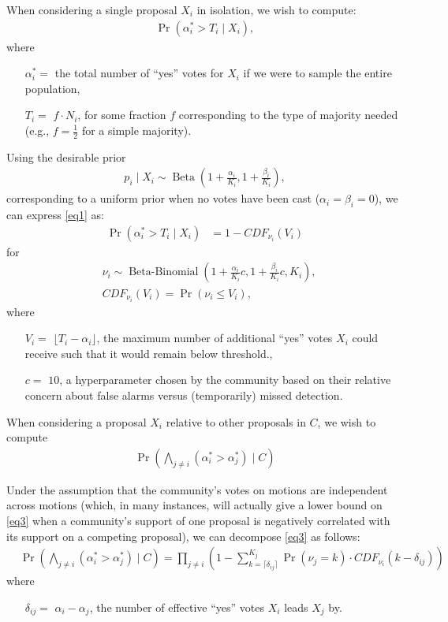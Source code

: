 \documentclass[format=acmsmall, review=true, screen=true, anonymous=true]{acmart}
\begin{document}
When considering a single proposal $X_i$ in isolation, we wish to compute:
\begin{align}\label{eq1}
\Pr(\alpha^*_i > T_i \mid X_i),
\end{align}
where
\begin{itemize}
\item[$\alpha^*_i = $] the total number of ``yes'' votes for $X_i$ if we were to sample the entire population,
\item[$T_i = $] $f \cdot N_i$, for some fraction $f$ corresponding to the type of majority needed
(e.g., $f=\frac{1}{2}$ for a simple majority).
\end{itemize}
Using the desirable prior
\begin{align}\label{eq2}
p_i \mid X_i \sim \operatorname{Beta}(1+\frac{\alpha_i}{K_i},1+\frac{\beta_i}{K_i}),
\end{align}
corresponding to a uniform prior when no votes have been cast ($\alpha_i = \beta_i = 0$), we can express \eqref{eq1} as:
\begin{align}\label{eq3}
\Pr(\alpha^*_i > T_i \mid X_i) &= 1 - {CDF}_{\nu_i}(V_i)
\end{align}
for
\begin{align*}
&\nu_i \sim \operatorname{Beta-Binomial}(1 + \frac{\alpha_i}{K_i}c, 1 + \frac{\beta_i}{K_i}c, K_i),\\
&{CDF}_{\nu_i}(V_i)  = \Pr(\nu_i \leq V_i),
\end{align*}
where
\begin{itemize}
\item[$V_i = $] $\lfloor{T_i - \alpha_i}\rfloor$, the maximum number of additional ``yes'' votes $X_i$ could receive such that it would remain below threshold.,
\item[$c = $] $10$, a hyperparameter chosen by the community based on their relative concern about false alarms versus (temporarily) missed detection.
\end{itemize}

When considering a proposal $X_i$ relative to other proposals in $C$, we wish to compute
\begin{align}\label{eq4}
\Pr\left(\bigwedge_{j \neq i} (\alpha^*_i > \alpha^*_j) \mid C\right)
\end{align}

Under the assumption that the community's votes on motions are independent across motions (which, in many instances, will actually give a lower bound on \eqref{eq3} when a community's support of one proposal is negatively correlated with its support on a competing proposal), we can decompose \eqref{eq3} as follows:
\begin{align}\label{eq5}
& \Pr\left(\bigwedge_{j \neq i} (\alpha^*_i > \alpha^*_j) \mid C\right) = \prod_{j \neq i}\left(1 - \sum_{k=\lceil\delta_{ij}\rceil}^{K_j} \Pr(\nu_j = k) \cdot {CDF}_{\nu_i}(k-\delta_{ij}) \right)
\end{align}
where
\begin{itemize}
\item[$\delta_{ij} = $] $\alpha_i - \alpha_j$, the number of effective ``yes'' votes $X_i$ leads $X_j$ by.
\end{itemize}
\end{document}
